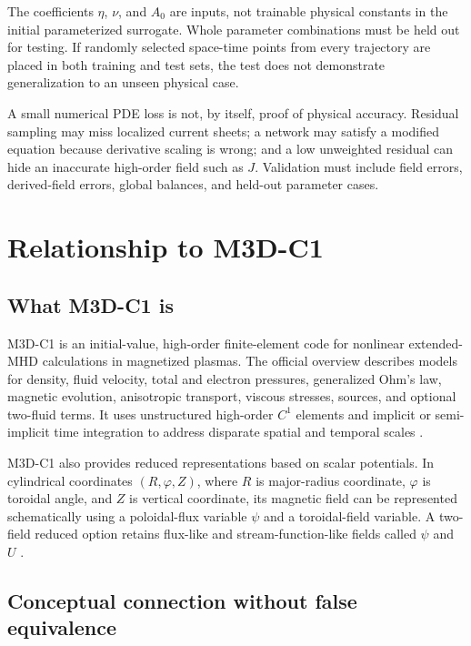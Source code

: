 \documentclass[11pt]{article}
\begin{document}
The coefficients $\eta$, $\nu$, and $A_0$ are inputs, not trainable physical constants in the initial parameterized surrogate. Whole parameter combinations must be held out for testing. If randomly selected space-time points from every trajectory are placed in both training and test sets, the test does not demonstrate generalization to an unseen physical case.

\begin{warningbox}
A small numerical PDE loss is not, by itself, proof of physical accuracy. Residual sampling may miss localized current sheets; a network may satisfy a modified equation because derivative scaling is wrong; and a low unweighted residual can hide an inaccurate high-order field such as $J$. Validation must include field errors, derived-field errors, global balances, and held-out parameter cases.
\end{warningbox}

\section{Relationship to M3D-C1}
\label{sec:m3dc1relation}

\subsection{What M3D-C1 is}

M3D-C1 is an initial-value, high-order finite-element code for nonlinear extended-MHD calculations in magnetized plasmas. The official overview describes models for density, fluid velocity, total and electron pressures, generalized Ohm's law, magnetic evolution, anisotropic transport, viscous stresses, sources, and optional two-fluid terms. It uses unstructured high-order $C^1$ elements and implicit or semi-implicit time integration to address disparate spatial and temporal scales \cite{M3DC1overview,Jardin2008}.

M3D-C1 also provides reduced representations based on scalar potentials. In cylindrical coordinates $(R,\varphi,Z)$, where $R$ is major-radius coordinate, $\varphi$ is toroidal angle, and $Z$ is vertical coordinate, its magnetic field can be represented schematically using a poloidal-flux variable $\psi$ and a toroidal-field variable. A two-field reduced option retains flux-like and stream-function-like fields called $\psi$ and $U$ \cite{M3DC1overview}.

\subsection{Conceptual connection without false equivalence}
\end{document}
